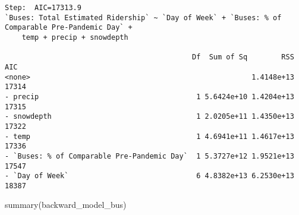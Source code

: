 \documentclass[
  letterpaper,
  DIV=11,
  numbers=noendperiod]{scrartcl}
\newenvironment{Shaded}{\begin{snugshade}}{\end{snugshade}}
\newcommand{\FunctionTok}[1]{\textcolor[rgb]{0.28,0.35,0.67}{#1}}
\newcommand{\NormalTok}[1]{\textcolor[rgb]{0.00,0.23,0.31}{#1}}
\begin{document}
\begin{verbatim}
Step:  AIC=17313.9
`Buses: Total Estimated Ridership` ~ `Day of Week` + `Buses: % of Comparable Pre-Pandemic Day` + 
    temp + precip + snowdepth

                                            Df  Sum of Sq        RSS   AIC
<none>                                                    1.4148e+13 17314
- precip                                     1 5.6424e+10 1.4204e+13 17315
- snowdepth                                  1 2.0205e+11 1.4350e+13 17322
- temp                                       1 4.6941e+11 1.4617e+13 17336
- `Buses: % of Comparable Pre-Pandemic Day`  1 5.3727e+12 1.9521e+13 17547
- `Day of Week`                              6 4.8382e+13 6.2530e+13 18387
\end{verbatim}

\begin{Shaded}
\begin{Highlighting}[]
\FunctionTok{summary}\NormalTok{(backward\_model\_bus)}
\end{Highlighting}
\end{Shaded}
\end{document}
